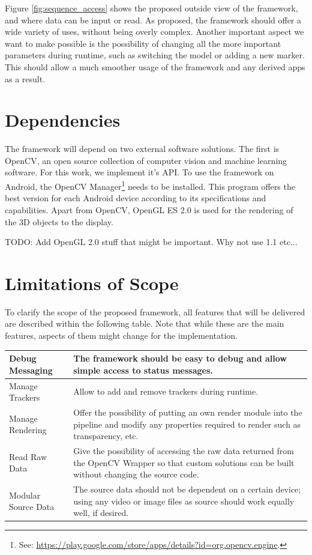 Figure \ref{fig:sequence_access} shows the proposed outside view of the framework, and where data can be input or read.
As proposed, the framework should offer a wide variety of uses, without being overly complex.
Another important aspect we want to make possible is the possibility of changing all the more important parameters during runtime, such as switching the model or adding a new marker.
This should allow a much smoother usage of the framework and any derived apps as a result.

\section{Dependencies}

The framework will depend on two external software solutions.
The first is OpenCV, an open source collection of computer vision and machine learning software.
For this work, we implement it's API.
To use the framework on Android, the OpenCV Manager\footnote{See: \url{https://play.google.com/store/apps/details?id=org.opencv.engine}.} needs to be installed.
This program offers the best version for each Android device according to its specifications and capabilities.
Apart from OpenCV, OpenGL ES 2.0 is used for the rendering of the 3D objects to the display.

TODO: Add OpenGL 2.0 stuff that might be important. Why not use 1.1 etc...

\section{Limitations of Scope}

To clarify the scope of the proposed framework, all features that will be delivered are described within the following table.
Note that while these are the main features, aspects of them might change for the implementation.

\begin{tabulary}{\textwidth}{L || L}
Debug Messaging & The framework should be easy to debug and allow simple access to status messages.\\
\hline
Manage Trackers & Allow to add and remove trackers during runtime.\\
\hline
Manage Rendering & Offer the possibility of putting an own render module into the pipeline and modify any properties required to render such as transparency, etc.\\
\hline
Read Raw Data & Give the possibility of accessing the raw data returned from the OpenCV Wrapper so that custom solutions can be built without changing the source code.\\
\hline
Modular Source Data & The source data should not be dependent on a certain device; using any video or image files as source should work equally well, if desired.
\end{tabulary}

